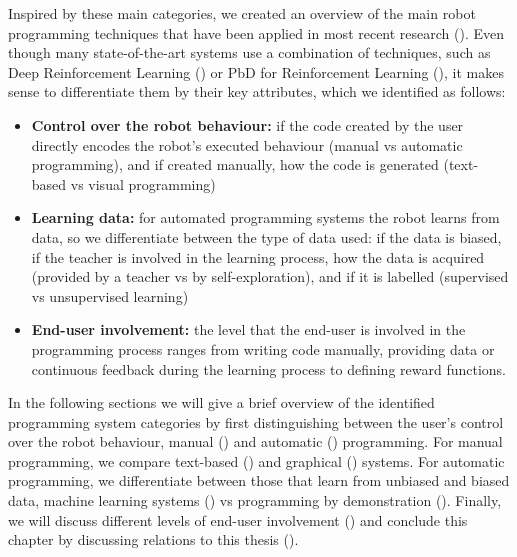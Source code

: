 Inspired by these main categories, we created an overview of the main robot programming techniques that have been applied in most recent research ().
Even though many state-of-the-art systems use a combination of techniques, such as Deep Reinforcement Learning (\cite{arulkumaran2017brief,mnih2015human}) or PbD for Reinforcement Learning (\cite{hester2017learning}), it makes sense to differentiate them by their key attributes, which we identified as follows: 
\begin{itemize}
	\item \textbf{Control over the robot behaviour:} if the code created by the user directly encodes the robot's executed behaviour (manual vs automatic programming), and if created manually, how the code is generated (text-based vs visual programming)
	\item \textbf{Learning data:} for automated programming systems the robot learns from data, so we differentiate between the type of data used: if the data is biased, if the teacher is involved in the learning process, how the data is acquired (provided by a teacher vs by self-exploration), and if it is labelled (supervised vs unsupervised learning) %
	\item \textbf{End-user involvement:} the level that the end-user is involved in the programming process ranges from writing code manually, providing data or continuous feedback during the learning process to defining reward functions.
\end{itemize}

In the following sections we will give a brief overview of the identified programming system categories by first distinguishing between the user's control over the robot behaviour, \ie manual () and automatic () programming.
For manual programming, we compare text-based () and graphical () systems.
For automatic programming, we differentiate between those that learn from unbiased and biased data, \ie machine learning systems () vs programming by demonstration ().
Finally, we will discuss different levels of end-user involvement %
() and conclude this chapter by discussing relations to this thesis ().

